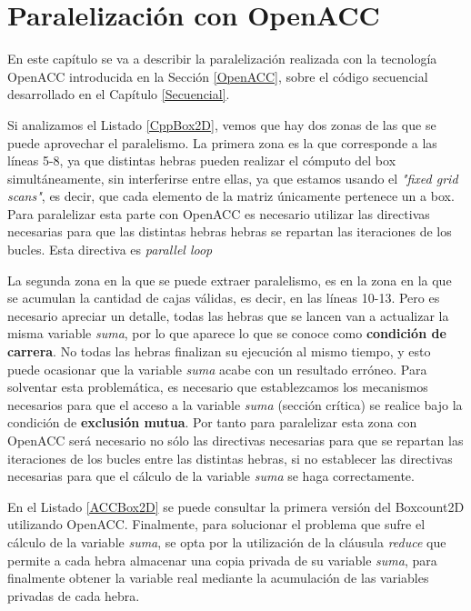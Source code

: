 \chapter{Paralelización con OpenACC}
\label{ParalelizacionOpenACC}
En este capítulo se va a describir la paralelización realizada con la tecnología OpenACC introducida en la Sección \ref{OpenACC}, sobre el código secuencial desarrollado en el Capítulo \ref{Secuencial}.

Si analizamos el Listado \ref{CppBox2D}, vemos que hay dos zonas de las que se puede aprovechar el paralelismo. La primera zona es la que corresponde a las líneas 5-8, ya que distintas hebras pueden realizar el cómputo del box simultáneamente, sin interferirse entre ellas, ya que estamos usando el \textit{"fixed grid scans"}, es decir, que cada elemento de la matriz únicamente pertenece un a box. Para paralelizar esta parte con OpenACC es necesario utilizar las directivas necesarias para que las distintas hebras hebras se repartan las iteraciones de los bucles. Esta directiva es \textit{parallel loop} 

La segunda zona en la que se puede extraer paralelismo, es en la zona en la que se acumulan la cantidad de cajas válidas, es decir, en las líneas 10-13. Pero es necesario apreciar un detalle, todas las hebras que se lancen van a actualizar la misma variable \textit{suma}, por lo que aparece lo que se conoce como \textbf{condición de carrera}. No todas las hebras finalizan su ejecución al mismo tiempo, y esto puede ocasionar que la variable \textit{suma} acabe con un resultado erróneo. Para solventar esta problemática, es necesario que establezcamos los mecanismos necesarios para que el acceso a la variable \textit{suma} (sección crítica) se realice bajo la condición de \textbf{exclusión mutua}. Por tanto para paralelizar esta zona con OpenACC será necesario no sólo las directivas necesarias para que se repartan las iteraciones de los bucles entre las distintas hebras, si no establecer las directivas necesarias para que el cálculo de la variable \textit{suma} se haga correctamente.

En el Listado \ref{ACCBox2D} se puede consultar la primera versión del Boxcount2D utilizando OpenACC. Finalmente, para solucionar el problema que sufre el cálculo de la variable \textit{suma}, se opta por la utilización de la cláusula \textit{reduce} que permite a cada hebra almacenar una copia privada de su variable \textit{suma}, para finalmente obtener la variable real mediante la acumulación de las variables privadas de cada hebra.


